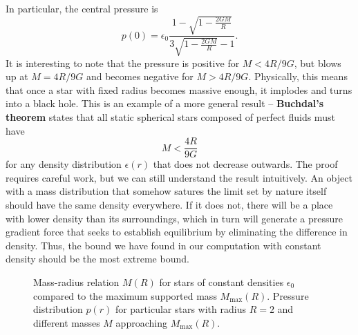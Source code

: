 In particular, the central pressure is
\begin{equation}
	p(0) = \epsilon_0 \frac{1 - \sqrt{1 - \frac{2GM}{R}}}{3 \sqrt{1-\frac{2GM}{R}} - 1} .
	\label{eq:incompressible_star:central_pressure}
\end{equation}
It is interesting to note that the pressure is positive for $M < 4R/9G$, but blows up at $M = 4R/9G$ and becomes negative for $M > 4R/9G$.
Physically, this means that once a star with fixed radius becomes massive enough, it implodes and turns into a black hole.
This is an example of a more general result -- \textbf{Buchdal's theorem} states that all static spherical stars composed of perfect fluids must have
\begin{equation}
	M < \frac{4R}{9G}
	\label{eq:incompressible_star:buchdal}
\end{equation}
for any density distribution $\epsilon(r)$ that does not decrease outwards. \cite{ref:buchdal}
The proof requires careful work, but we can still understand the result intuitively.
An object with a mass distribution that somehow satures the limit set by nature itself should have the same density everywhere.
If it does not, there will be a place with lower density than its surroundings, which in turn will generate a pressure gradient force that seeks to establish equilibrium by eliminating the difference in density.
Thus, the bound we have found in our computation with constant density should be the most extreme bound.

\begin{figure}[hb!]
\centering
{}
\caption{Mass-radius relation $M(R)$ for stars of constant densities $\epsilon_0$ compared to the maximum supported mass $M_\text{max}(R)$. Pressure distribution $p(r)$ for particular stars with radius $R=2$ and different masses $M$ approaching $M_\text{max}(R)$.}
\end{figure}

